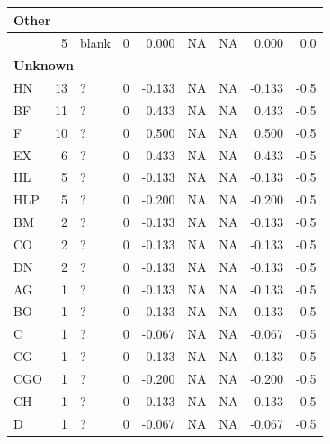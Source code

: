 \documentclass[
  letterpaper,
  DIV=11,
  numbers=noendperiod]{scrreprt}
\begin{document}
\begin{tabular}[t]{l|r|l|r|r|r|r|r|r}
\hline
\multicolumn{9}{l}{\textbf{Other}}\\
\hline
\hspace{1em} & 5 & blank & 0 & 0.000 & NA & NA & 0.000 & 0.0\\
\hline
\multicolumn{9}{l}{\textbf{Unknown}}\\
\hline
\hspace{1em}HN & 13 & ? & 0 & -0.133 & NA & NA & -0.133 & -0.5\\
\hline
\hspace{1em}BF & 11 & ? & 0 & 0.433 & NA & NA & 0.433 & -0.5\\
\hline
\hspace{1em}F & 10 & ? & 0 & 0.500 & NA & NA & 0.500 & -0.5\\
\hline
\hspace{1em}EX & 6 & ? & 0 & 0.433 & NA & NA & 0.433 & -0.5\\
\hline
\hspace{1em}HL & 5 & ? & 0 & -0.133 & NA & NA & -0.133 & -0.5\\
\hline
\hspace{1em}HLP & 5 & ? & 0 & -0.200 & NA & NA & -0.200 & -0.5\\
\hline
\hspace{1em}BM & 2 & ? & 0 & -0.133 & NA & NA & -0.133 & -0.5\\
\hline
\hspace{1em}CO & 2 & ? & 0 & -0.133 & NA & NA & -0.133 & -0.5\\
\hline
\hspace{1em}DN & 2 & ? & 0 & -0.133 & NA & NA & -0.133 & -0.5\\
\hline
\hspace{1em}AG & 1 & ? & 0 & -0.133 & NA & NA & -0.133 & -0.5\\
\hline
\hspace{1em}BO & 1 & ? & 0 & -0.133 & NA & NA & -0.133 & -0.5\\
\hline
\hspace{1em}C & 1 & ? & 0 & -0.067 & NA & NA & -0.067 & -0.5\\
\hline
\hspace{1em}CG & 1 & ? & 0 & -0.133 & NA & NA & -0.133 & -0.5\\
\hline
\hspace{1em}CGO & 1 & ? & 0 & -0.200 & NA & NA & -0.200 & -0.5\\
\hline
\hspace{1em}CH & 1 & ? & 0 & -0.133 & NA & NA & -0.133 & -0.5\\
\hline
\hspace{1em}D & 1 & ? & 0 & -0.067 & NA & NA & -0.067 & -0.5\\

\end{tabular}
\end{document}
